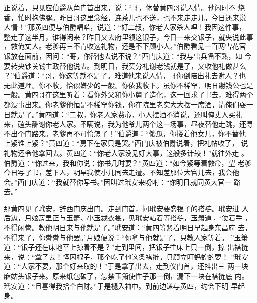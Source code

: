 正说着，只见应伯爵从角门首出来，说：“哥，休替黄四哥说人情。他闲时不
烧香，忙时抱佛腿。昨日哥这里念经，连茶儿也不送，也不来走走儿，今日还来说
人情！”那黄四便与伯爵唱喏，说道：“好二叔，你老人家杀人哩！我因这件事，
整走了这半月，谁得闲来？昨日又去府里领这银子，今日一来交银子，就央说此事
，救俺丈人。老爹再三不肯收这礼物，还是不下顾小人。”伯爵看见一百两雪花官
银放在面前，因问：“哥，你替他去说不说？”西门庆道：“我与雷兵备不熟，如
今要转央钞关钱主政替他说去。到明日，我买分礼谢老钱就是了，又收他礼做甚么
？”伯爵道：“哥，你这等就不是了。难道他来说人情，哥你倒陪出礼去谢人？也
无此道理。你不收，恰似嫌少的一般。你依我收下。虽你不稀罕，明日谢钱公也是
一般。黄四哥在这里听着：看你外父和你小舅子造化，这一回求了书去，难得两个
都没事出来。你老爹他恒是不稀罕你钱，你在院里老实大大摆一席酒，请俺们耍一
日就是了。”黄四道：“二叔，你老人家费心，小人摆酒不消说，还叫俺丈人买礼
来，磕头酬谢你老人家。不瞒说，我为他爷儿两个这一场事，昼夜替他走跳，还寻
不出个门路来。老爹再不可怜怎了！”伯爵道：“傻瓜，你搂着他女儿，你不替他
上紧谁上紧？”黄四道：“房下在家只是哭。”西门庆被伯爵说着，把礼帖收了，
说礼物还令他拿回去。黄四道：“你老人家没见好大事，这般多计较！”就往外走
。伯爵道：“你过来，我和你说：你书几时要？”黄四道：“如今紧等着救命，望
老爹今日写了书，差下人，明早我使小儿同去走遭。不知差那位大官儿去，我会他
会。”西门庆道：“我就替你写书。”因叫过玳安来吩咐：“你明日就同黄大官一
路去。”

那黄四见了玳安，辞西门庆出门。走到门首，问玳安要盛银子的褡裢。玳安进
入后边，月娘房里正与玉箫、小玉裁衣裳，见玳安站着等褡裢，玉箫道：“使着手
，不得闲誊。教他明日来与他就是了。”玳安道：“黄四等紧着明日早起身东昌府
去，不得来了，你誊誊与他罢。”月娘便说：“你拿与他就是了，只教人家等着。
”玉箫道：“银子还在床地平上掠着不是？”走到里间，把银子往床上只一倒，掠
出褡裢来，说：“拿了去！怪囚根子，那个吃了他这条褡裢，只顾立叮蚂蝗的要！
”玳安道：“人家不要，那个好来取的！”于是拿了出去，走到仪门首，还抖出三
两一块麻姑头银子来。原来纸包破了，怎禁玉箫使性子那一倒，漏下一块在褡裢底
内。玳安道：“且喜得我拾个白财。”于是褪入袖中。到前边递与黄四，约会下明
早起身。

